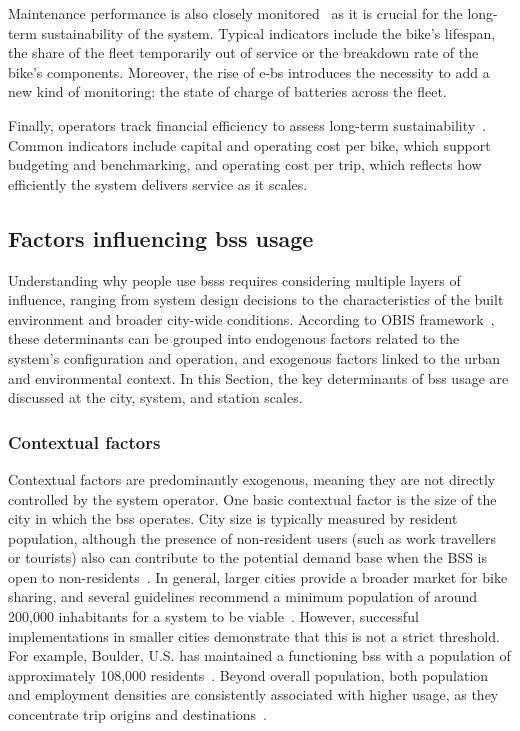     Maintenance performance is also closely monitored~\cite{Rossow2018, Santander2022} as it is crucial for the long-term sustainability of the system. Typical indicators include the bike's lifespan, the share of the fleet temporarily out of service or the breakdown rate of the bike's components. Moreover, the rise of \acp{e-b} introduces the necessity to add a new kind of monitoring: the state of charge of batteries across the fleet.

    Finally, operators track financial efficiency to assess long-term sustainability~\cite{Yanocha2018}. Common indicators include capital and operating cost per bike, which support budgeting and benchmarking, and operating cost per trip, which reflects how efficiently the system delivers service as it scales.

    \subsection[Factors influencing BSS usage]{Factors influencing \acs{bss} usage}
    \label{sec:factors_influencing_bss_usage}

    Understanding why people use \acp{bss} requires considering multiple layers of influence, ranging from system design decisions to the characteristics of the built environment and broader city-wide conditions. According to OBIS framework~\cite{OBIS2011}, these determinants can be grouped into endogenous factors related to the system’s configuration and operation, and exogenous factors linked to the urban and environmental context. In this Section, the key determinants of \ac{bss} usage are discussed at the city, system, and station scales.


        \subsubsection{Contextual factors}

        Contextual factors are predominantly exogenous, meaning they are not directly controlled by the system operator. One basic contextual factor is the size of the city in which the \ac{bss} operates. City size is typically measured by resident population, although the presence of non-resident users (such as work travellers or tourists) also can contribute to the potential demand base when the BSS is open to non-residents~\cite{Ferrando2007}. In general, larger cities provide a broader market for bike sharing, and several guidelines recommend a minimum population of around 200{,}000 inhabitants for a system to be viable~\cite{Ferrando2007, CTCN2017}. However, successful implementations in smaller cities demonstrate that this is not a strict threshold. For example, Boulder, U.S. has maintained a functioning \ac{bss} with a population of approximately 108,000 residents~\cite{Yanocha2018}. Beyond overall population, both population and employment densities are consistently associated with higher usage, as they concentrate trip origins and destinations~\cite{Tran2015, Chen2021_Identifying}.

